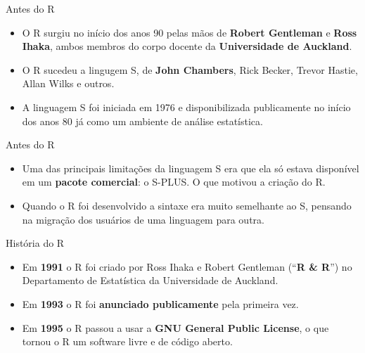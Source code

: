 \documentclass[
  ignorenonframetext,
  serif,
  professionalfont,
  usenames,
  dvipsnames,
  aspectratio = 169]{beamer}
\def\beginAHalfColumn{\begin{minipage}{0.49\textwidth}}%
\def\endColumns{\end{minipage}}%
\begin{document}
\begin{frame}{Antes do R}
\protect\hypertarget{antes-do-r}{}
\beginAHalfColumn

\begin{itemize}
\item
  O R surgiu no início dos anos 90 pelas mãos de
  \textbf{Robert Gentleman} e \textbf{Ross Ihaka}, ambos membros do
  corpo docente da \textbf{Universidade de Auckland}.
\item
  O R sucedeu a lingugem S, de \textbf{John Chambers}, Rick Becker,
  Trevor Hastie, Allan Wilks e outros.
\item
  A linguagem S foi iniciada em 1976 e disponibilizada publicamente no
  início dos anos 80 já como um ambiente de análise estatística.
\end{itemize}

\endColumns
\beginAHalfColumn

\endColumns
\end{frame}

\begin{frame}{Antes do R}
\protect\hypertarget{antes-do-r-1}{}
\beginAHalfColumn

\begin{itemize}
\item
  Uma das principais limitações da linguagem S era que ela só estava
  disponível em um \textbf{pacote comercial}: o S-PLUS. O que motivou a
  criação do R.
\item
  Quando o R foi desenvolvido a sintaxe era muito semelhante ao S,
  pensando na migração dos usuários de uma linguagem para outra.
\end{itemize}

\endColumns
\beginAHalfColumn

\endColumns
\end{frame}

\begin{frame}{História do R}
\protect\hypertarget{histuxf3ria-do-r}{}
\beginAHalfColumn

\begin{itemize}
\item
  Em \textbf{1991} o R foi criado por Ross Ihaka e Robert Gentleman
  (``\textbf{R \& R}'') no Departamento de Estatística da Universidade
  de Auckland.
\item
  Em \textbf{1993} o R foi \textbf{anunciado publicamente} pela primeira
  vez.
\item
  Em \textbf{1995} o R passou a usar a
  \textbf{GNU General Public License}, o que tornou o R um software
  livre e de código aberto.
\end{itemize}

\endColumns
\beginAHalfColumn

\endColumns
\end{frame}
\end{document}
